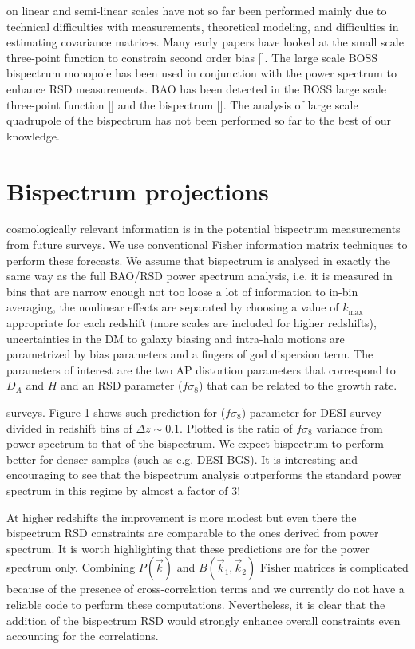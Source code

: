on linear and semi-linear scales have not so far been performed mainly due to
technical difficulties with measurements, theoretical modeling, and
difficulties in estimating covariance matrices. Many early papers have looked
at the small scale three-point function to constrain second order bias []. The
large scale BOSS bispectrum monopole has been used in conjunction with the
power spectrum to enhance RSD measurements. BAO has been detected in the BOSS
large scale three-point function [] and the bispectrum []. The analysis of
large scale quadrupole of the bispectrum has not been performed so far to the
best of our knowledge.

\section{Bispectrum projections}

cosmologically relevant information is in the potential bispectrum measurements
from future surveys. We use conventional Fisher information matrix techniques
to perform these forecasts. We assume that bispectrum is analysed in exactly
the same way as the full BAO/RSD power spectrum analysis, i.e. it is measured
in bins that are narrow enough not too loose a lot of information to in-bin
averaging, the nonlinear effects are separated by choosing a value of
$k_\mathrm{max}$ appropriate for each redshift (more scales are included for
higher redshifts), uncertainties in the DM to galaxy biasing and intra-halo
motions are parametrized by bias parameters and a fingers of god dispersion
term. The parameters of interest are the two AP distortion parameters that
correspond to $D_A$ and $H$ and an RSD parameter ($f\sigma_8$) that can be
related to the growth rate.

surveys. Figure 1 shows such prediction for ($f\sigma_8$) parameter for DESI
survey divided in redshift bins of $\Delta z \sim 0.1$. Plotted is the ratio of
$f\sigma_8$ variance from power spectrum to that of the bispectrum. We expect
bispectrum to perform better for denser samples (such as e.g. DESI BGS). It is
interesting and encouraging to see that the bispectrum analysis outperforms the
standard power spectrum in this regime by almost a factor of 3!

At higher redshifts the improvement is more modest but even there the
bispectrum RSD constraints are comparable to the ones derived from power
spectrum. It is worth highlighting that these predictions are for the power
spectrum only. Combining $P(\vec{k})$ and $B(\vec{k}_1,\vec{k}_2)$ Fisher
matrices is complicated because of the presence of cross-correlation terms and
we currently do not have a reliable code to perform these computations.
Nevertheless, it is clear that the addition of the bispectrum RSD would
strongly enhance overall constraints even accounting for the correlations.

